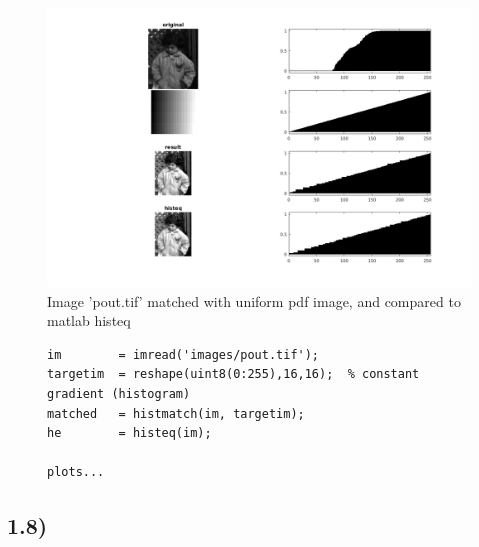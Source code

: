 \documentclass[a4paper]{article}
\begin{document}
\begin{figure}[h!]
  \centering
  \includegraphics[width=0.8\linewidth, trim={40 40 40 30 }, clip=true]{./1_7.png}
  \caption{Image 'pout.tif' matched with uniform pdf image, and compared to matlab histeq}
  \label{fig:1.7}
\end{figure}

\begin{figure}[h!]
  \begin{lstlisting}[caption='application of histmatch to constant histogram image']
im        = imread('images/pout.tif');
targetim  = reshape(uint8(0:255),16,16);  % constant gradient (histogram)
matched   = histmatch(im, targetim);
he        = histeq(im);

plots...\end{lstlisting}
\end{figure}

\newpage
\subsection*{1.8)}
\end{document}
